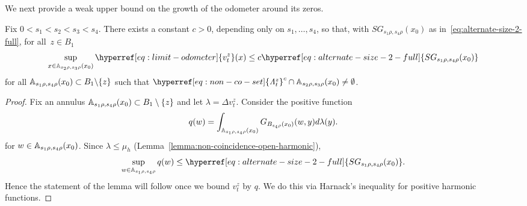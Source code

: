 \documentclass[12pt]{amsart}
\numberwithin{equation}{section}
\newcommand{\cluster}[2]{\hyperref[eq:non-co-set]{\mathit{\Lambda}^{#1}_{#2}}}
\newcommand{\odometer}[2]{\hyperref[eq:limit-odometer]{v^{#1}_{#2}}}
\newcommand{\SGrhofull}[4]{\hyperref[eq:alternate-size-2-full]{SG_{#3 #1, #4 #1}(#2)}}
\begin{document}
	
	We next provide a weak upper bound on the growth of the odometer around its zeros.  
	\begin{lemma} \label{lemma:odometer-bound-lqg-mass}
		Fix $0 < s_1  < s_2 < s_3 < s_4$. 
		There exists a constant $c > 0$, depending only on $s_1, \ldots, s_4$,  so that, with $\SGrhofull{\rho}{x_0}{s_1}{s_4}$ as in~\eqref{eq:alternate-size-2-full}, for all~$z \in B_1$
		\[
		\sup_{x \in \A_{s_2 \rho,s_3 \rho}(x_0)} \odometer{z}{t}(x) \leq c  \SGrhofull{\rho}{x_0}{s_1}{s_4}
		\]
		for all $\mathbb{A}_{s_1 \rho,s_4 \rho}(x_0) \subset B_1 \backslash \{z\}$ such that ${{{\cluster{z}{t}}}}^c \cap  \A_{s_2 \rho,s_3 \rho}(x_0) \neq \emptyset$. 
	\end{lemma}
	
	\begin{proof}
		Fix an annulus $\mathbb{A}_{s_1 \rho,s_4 \rho}(x_0) \subset B_1 \setminus \{z\}$ and let $\lambda = \Delta \odometer{z}{t}$.
		Consider the positive function  
		\[
		q(w) = \int_{\mathbb{A}_{s_1 \rho,s_4 \rho}(x_0)} G_{B_{s_4 \rho}(x_0)}(w,y) d \lambda(y).
		\]
		for $w \in \mathbb{A}_{s_1 \rho,s_4 \rho}(x_0)$.
		Since $\lambda \leq \mu_h$ (Lemma~\ref{lemma:non-coincidence-open-harmonic}), 
		\begin{equation} \label{eq:q-inequality} 
		\sup_{w \in \A_{s_1 \rho,s_4 \rho}} q(w) \leq \SGrhofull{\rho}{x_0}{s_1}{s_4}.
		\end{equation}
		Hence the statement of the lemma will follow once we bound $\odometer{z}{t}$ by $q$. We do this via Harnack's inequality for positive harmonic functions.
		

\end{proof}
\end{document}
